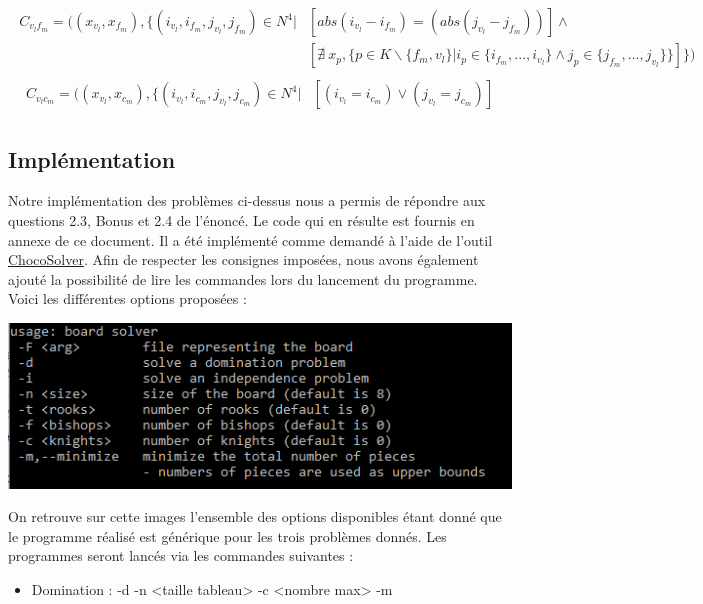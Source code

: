 \documentclass[a4paper]{article}
\begin{document}
\begin{align*}
\begin{split}
C_{v_lf_m} = ( (x_{v_l},x_{f_m}), \{ (i_{v_l},i_{f_m},j_{v_l},j_{f_m}) \in N^4 | &  [ abs(i_{v_l} - i_{f_m}) = (abs(j_{v_l} - j_{f_m})) ] \wedge \\
& [ \nexists \ x_p, \{ p \in K \backslash \{f_m,v_l\} | i_{p} \in \{ i_{f_m},...,i_{v_l} \} \wedge j_p \in \{ j_{f_m},...,j_{v_l} \}\}  ]  \} )
\end{split}
\end{align*}
\begin{align*}
\begin{split}
C_{v_lc_m} = ( (x_{v_l},x_{c_m}), \{ (i_{v_l},i_{c_m},j_{v_l},j_{c_m}) \in N^4 | &  [ (i_{v_l} = i_{c_m}) \vee(j_{v_l} = j_{c_m}) ]
\end{split}
\end{align*}

\subsection{Implémentation}
Notre implémentation des problèmes ci-dessus nous a permis de répondre aux questions 2.3, Bonus et 2.4 de l'énoncé. Le code qui en résulte est fournis en annexe de ce document. Il a été implémenté comme demandé à l'aide de l'outil \href{http://www.choco-solver.org/}{ChocoSolver}.
Afin de respecter les consignes imposées, nous avons également ajouté la possibilité de lire les commandes lors du lancement du programme. Voici les différentes options proposées : 
\begin{center}
\includegraphics[scale=0.7]{image.png}
\end{center}
On retrouve sur cette images l'ensemble des options disponibles étant donné que le programme réalisé est générique pour les trois problèmes donnés. Les programmes seront lancés via les commandes suivantes : 
\begin{itemize}
\item Domination : -d -n <taille tableau> -c <nombre max> -m
\end{itemize}
\end{document}
